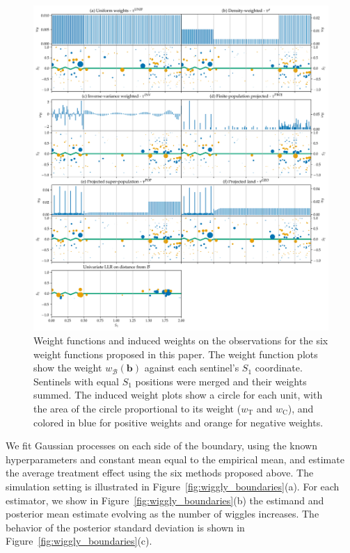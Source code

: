 \documentclass[letter]{article}
\makeatletter
\def\maxwidth{\ifdim\Gin@nat@width>\linewidth\linewidth
\else\Gin@nat@width\fi}
\let\Oldincludegraphics\includegraphics
\renewcommand{\includegraphics}[1]{\Oldincludegraphics[width=1.0\maxwidth]{#1}}
\newcommand{\treat}{\mathrm{T}}
\newcommand{\ctrol}{\mathrm{C}}
\newcommand{\boundary}{\mathcal{B}}
\newcommand{\sentinels}{\bm{b}}
\newcommand{\weightb}{w_{\boundary}}
\newcommand{\wt}{w_{\treat}}
\newcommand{\wc}{w_{\ctrol}}
\makeatother
\begin{document}
    	\begin{figure}
\centering
\includegraphics{../figures/weight_functions.png}
\caption{\label{fig:weight_functions}Weight functions and induced weights on the observations for the six weight functions proposed in this paper. The weight function plots show the weight \(\weightb(\sentinels)\) against each sentinel's \(S_1\) coordinate. Sentinels with equal \(S_1\) positions were merged and their weights summed. The induced weight plots show a circle for each unit, with the area of the circle proportional to its weight (\(\wt\) and \(\wc\)), and colored in blue for positive weights and orange for negative weights.}
\end{figure}
    


    	We fit Gaussian processes on each side of the boundary,
using the known hyperparameters and constant mean equal to the empirical mean,
and estimate the average treatment effect using the six methods proposed above.
The simulation setting is illustrated in Figure~\ref{fig:wiggly_boundaries}(a).
For each estimator, we show in Figure~\ref{fig:wiggly_boundaries}(b) the estimand and posterior mean estimate evolving as the number of wiggles increases.
The behavior of the posterior standard deviation is shown in Figure~\ref{fig:wiggly_boundaries}(c).
\end{document}
